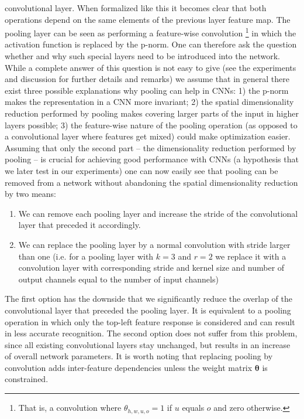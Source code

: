 \documentclass{article} \usepackage{iclr2015,times}
\begin{document}
 convolutional layer. When
 formalized like this it becomes clear that both operations depend on the same elements of the 
 previous layer feature map. The pooling layer can be seen as performing a feature-wise convolution
\footnote{That is, a convolution where $\theta_{h,w,u,o} = 1$ if $u$
  equals $o$ and zero otherwise.} 
in which the
 activation function is replaced by the p-norm. 
 One can therefore ask the question whether and why such special layers need to be introduced into the network.
 While a complete answer of this question is not easy to give (see the
 experiments and discussion for further details and remarks) we assume that in general there exist three possible explanations why
pooling can help in CNNs: 1) the p-norm makes the representation in a CNN more invariant; 2) the spatial dimensionality
reduction performed by pooling makes covering larger 
parts of the input in higher layers possible; 3) the feature-wise
nature of the pooling operation (as opposed to a convolutional layer where features get mixed) could make optimization easier.
Assuming that only the second part -- the dimensionality reduction
performed by pooling -- is crucial for achieving good performance with
CNNs (a hypothesis that we later test in our experiments) one can now
easily see that pooling can be removed from a network without
abandoning the spatial dimensionality reduction by two means:
\begin{enumerate}
  \item We can remove each pooling layer and increase the stride of the
convolutional layer that preceded it accordingly.
  \item We can replace the pooling layer by a normal convolution with
    stride larger than one (i.e. for a pooling layer with $k=3$ and
    $r=2$ we replace it with a convolution layer with corresponding stride
    and kernel size and number of output channels equal to the number of input channels)
\end{enumerate}
The first option has the downside that we significantly reduce the
overlap of the convolutional layer that preceded the pooling layer. It
is equivalent to a pooling operation in which only the top-left
feature response is considered and can result in less accurate
recognition. The second option does not suffer from this problem,
since all existing convolutional layers stay unchanged, but results in
an increase of overall network parameters. It is worth noting that
replacing pooling by convolution adds inter-feature dependencies
unless the weight matrix 
$\mathbf{\theta}$
is constrained.
\end{document}
